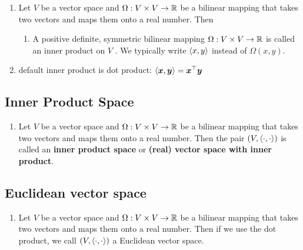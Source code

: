 \begin{enumerate}
    \item Let $V$ be a vector space and $\Omega  : V \times  V \to  \mathbb{R}$ be a bilinear mapping that takes two vectors and maps them onto a real number. Then
    \hfill \cite{mfml/book/mml/Deisenroth-Faisal-Ong}
    \begin{enumerate}
        \item A positive definite, symmetric bilinear mapping $\Omega  : V \times  V \to  \mathbb{R}$ is called an inner product on $V$ .
        We typically write $\langle x, y\rangle$ instead of $\Omega (x, y)$.
        \hfill \cite{mfml/book/mml/Deisenroth-Faisal-Ong}
    \end{enumerate}

    \item default inner product is dot product: $\langle\bm{x}, \bm{y}\rangle = \bm{x}^\top \bm{y}$
    \hfill \cite{mfml/book/mml/Deisenroth-Faisal-Ong}
\end{enumerate}







\subsection{Inner Product Space}

\begin{enumerate}
    \item Let $V$ be a vector space and $\Omega  : V \times  V \to  \mathbb{R}$ be a bilinear mapping that takes two vectors and maps them onto a real number.
    Then the pair $(V, \langle\cdot, \cdot\rangle)$ is called an \textbf{inner product space} or \textbf{(real) vector space with inner product}.
\end{enumerate}




\subsection{Euclidean vector space}

\begin{enumerate}
    \item Let $V$ be a vector space and $\Omega : V \times V \to \mathbb{R}$ be a bilinear mapping that takes two vectors and maps them onto a real number. Then if we use the dot product, we call $(V,\langle\cdot, \cdot\rangle)$ a Euclidean vector space.
\end{enumerate}





